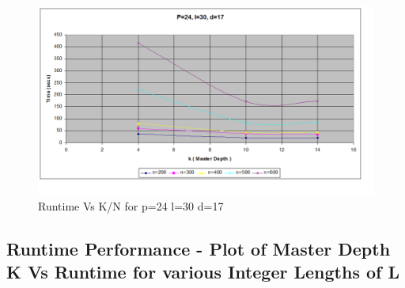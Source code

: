 \documentclass[twoside,11pt]{article}\usepackage{amsmath,amsfonts,amsthm,fullpage}
\begin{document}
\begin{figure}[!htbp]
\centering
\includegraphics[scale=.46]{images/pld_p=24-l=30-d=17} 
\caption{Runtime Vs K/N for p=24 l=30 d=17}
\label{K Vs N for p=24 l=30 d=17}
\end{figure}




\pagebreak
\subsection{Runtime Performance - Plot of Master Depth K Vs Runtime for various Integer Lengths of L}
\end{document}
